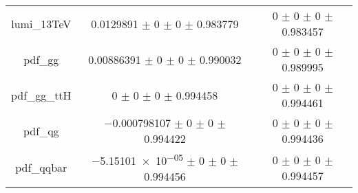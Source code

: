 \begin{table}
\begin{tabular}{ccc}
lumi\_13TeV & \num{0.0129891} $\pm$ \num{0} $\pm$ \num{0} $\pm$ \num{0.983779} & \num{0} $\pm$ \num{0} $\pm$ \num{0} $\pm$ \num{0.983457}\\
pdf\_gg & \num{0.00886391} $\pm$ \num{0} $\pm$ \num{0} $\pm$ \num{0.990032} & \num{0} $\pm$ \num{0} $\pm$ \num{0} $\pm$ \num{0.989995}\\
pdf\_gg\_ttH & \num{0} $\pm$ \num{0} $\pm$ \num{0} $\pm$ \num{0.994458} & \num{0} $\pm$ \num{0} $\pm$ \num{0} $\pm$ \num{0.994461}\\
pdf\_qg & \num{-0.000798107} $\pm$ \num{0} $\pm$ \num{0} $\pm$ \num{0.994422} & \num{0} $\pm$ \num{0} $\pm$ \num{0} $\pm$ \num{0.994436}\\
pdf\_qqbar & \num{-5.15101e-05} $\pm$ \num{0} $\pm$ \num{0} $\pm$ \num{0.994456} & \num{0} $\pm$ \num{0} $\pm$ \num{0} $\pm$ \num{0.994457}\\
\bottomrule
\end{tabular}
\end{table}